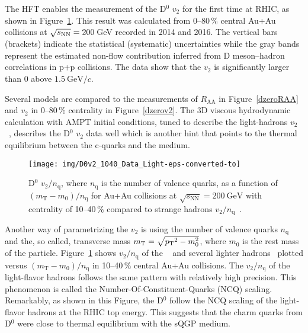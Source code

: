 The HFT enables the measurement of the D$^0$ $v_2$ for the first 
time at RHIC, as shown in Figure~\ref{dzerov2NCQ}\@. This result was calculated from 0--80$\,\%$ central Au+Au collisions at $\sqrt{s_\text{NN}} = 200\,$GeV recorded in 2014 and 2016. The vertical bars (brackets) indicate 
the statistical (systematic)
uncertainties while the gray bands represent the estimated non-flow contribution inferred
from D meson--hadron correlations in p+p collisions. The data show that the $v_2$
is significantly larger than 0 above $\SI{1.5}{\giga\electronvolt}/c$\@.

Several models \cite{Hydro2012,Hydro2015,PHSD2014,LBT,LBTprivate,TAMU,PHSD2015,SUBATECHvn,SUBATECHquenching,Duke,Duke2015} are compared to the
measurements of $R_\mathrm{AA}$ in Figure~\ref{dzeroRAA} and $v_2$ in 0--80$\,\%$ centrality 
in Figure~\ref{dzerov2}\@. The 3D viscous hydrodynamic calculation with AMPT 
initial conditions, tuned to describe the light-hadrons $v_2$~\cite{Hydro2012,Hydro2015}, describes the D$^0$ $v_2$ data well 
which is another hint that points to the thermal equilibrium between the c-quarks and the medium.

\begin{figure}[!htb]
\begin{center}
  \texttt{[image: img/D0v2\_1040\_Data\_Light-eps-converted-to]}\\
\end{center}
\caption{\label{dzerov2NCQ}D$^0$ $v_2/n_\mathrm{q}$, where $n_\mathrm{q}$ is the number of valence quarks, as a function of $(m_\mathrm{T} - m_0)/n_\mathrm{q}$ for Au+Au collisions
at $\sqrt{s_\mathrm{NN}} = \SI{200}{\giga\electronvolt}$ with centrality of 10--40$\,\%$ compared to strange hadrons $v_2/n_\mathrm{q}$~\cite{D0v2paper,StrangeAndChargedv2paper}.}
\end{figure}


Another way of parametrizing the $v_2$ is using the number of valence quarks $n_\mathrm{q}$ and the, so called, transverse mass $m_\mathrm{T}= \sqrt{{}p_{\mathrm{T}}{}^2 - m_0^2}$, where $m_0$ is the rest mass of the particle. Figure~\ref{dzerov2NCQ} shows $v_2 / n_\mathrm{q}$ of the \dzero~\cite{D0v2paper} and several lighter hadrons~\cite{StrangeAndChargedv2paper} plotted versus $(m_\mathrm{T} - m_0)/n_\mathrm{q}$ in 10--40$\,\%$ central Au+Au collisions\@. The $v_2/n_\mathrm{q}$ of the light-flavor hadrons follows the same pattern with relatively high precision. This phenomenon is called the Number-Of-Constituent-Quarks (NCQ) scaling. Remarkably, as shown in this Figure, the D$^0$ follow the NCQ scaling of the light-flavor hadrons at the RHIC top energy. This suggests that the charm quarks from D$^0$ were close to thermal equilibrium with the sQGP medium.

